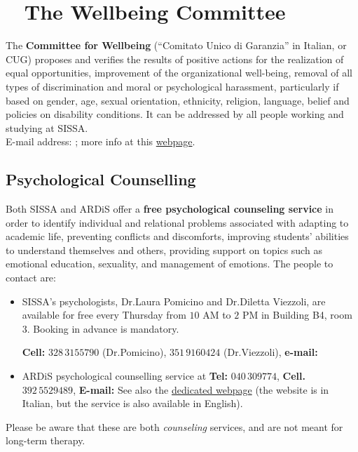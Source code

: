 \documentclass{sissavademecum}
\begin{document}
\chapter{\texorpdfstring{\faCommentMedical\ }{} The Wellbeing Committee }

The \textbf{Committee for Wellbeing} (``Comitato Unico di Garanzia'' in Italian, or CUG) proposes and verifies the results of positive actions for the realization of equal opportunities, improvement of the organizational well-being, removal of all types of discrimination and moral or psychological harassment, particularly if based on gender, age, sexual orientation, ethnicity, religion, language, belief and policies on disability conditions. It can be addressed by all people working and studying at SISSA. \\
E-mail address: ; more info at this \href{http://www.sissa.it/committee-wellbeing-cug}{webpage}.


\section{Psychological Counselling}

Both SISSA and ARDiS offer a \textbf{free psychological counseling service} in order to identify individual and relational problems associated with adapting to academic life, preventing conflicts and 	discomforts, improving students' abilities to understand themselves and others, providing support on topics such as emotional education, sexuality, and management of emotions. The people to contact are:
\begin{itemize}
	\item SISSA's psychologists, Dr.\@ Laura Pomicino and Dr.\@ Diletta Viezzoli, are available for free every Thursday from $10$ AM to $2$ PM in Building B4, room $3$. Booking in advance is mandatory. 
	
	\textbf{Cell: }$328 \, 3155790$ (Dr.\@ Pomicino), $351 \, 9160424$ (Dr.\@ Viezzoli), \textbf{e-mail: }{}
	
	\item ARDiS psychological counselling service at 	\textbf{Tel: }$040 \, 309774$, \textbf{Cell. }$392 \, 5529489$, \textbf{E-mail:} {} See also the \href{http://www.ardiss.fvg.it/contenuti.php?view=page&id=46}{dedicated webpage} (the website is in Italian, but the service is also available in English).
\end{itemize}
Please be aware that these are both \emph{counseling} services, and are not meant for long-term therapy.
\end{document}
